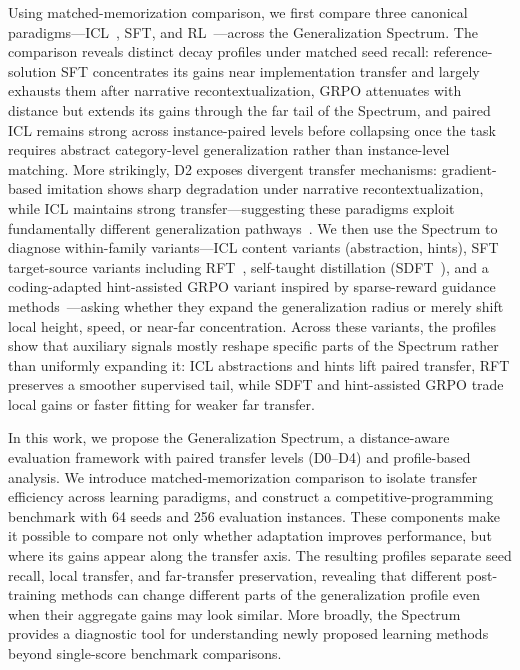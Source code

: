\documentclass[]{bytedance_seed}
\theoremstyle{plain}
\theoremstyle{definition}
\theoremstyle{remark}
\begin{document}
Using matched-memorization comparison, we first compare three canonical paradigms---ICL~\citep{brown2020language, dong2024survey}, SFT, and RL~\citep{ouyang2022training, shao2024grpo}---across the Generalization Spectrum. The comparison reveals distinct decay profiles under matched seed recall: reference-solution SFT concentrates its gains near implementation transfer and largely exhausts them after narrative recontextualization, GRPO attenuates with distance but extends its gains through the far tail of the Spectrum, and paired ICL remains strong across instance-paired levels before collapsing once the task requires abstract category-level generalization rather than instance-level matching. More strikingly, D2 exposes divergent transfer mechanisms: gradient-based imitation shows sharp degradation under narrative recontextualization, while ICL maintains strong transfer---suggesting these paradigms exploit fundamentally different generalization pathways~\citep{mosbach2023fewshot}. We then use the Spectrum to diagnose within-family variants---ICL content variants (abstraction, hints), SFT target-source variants including RFT~\citep{yuan2023rft}, self-taught distillation (SDFT~\citep{sdft2026,opsd2026,sdpo2026}), and a coding-adapted hint-assisted GRPO variant inspired by sparse-reward guidance methods~\citep{li2026questa,ghpo2025,zhang2026bread,zhang2025stephint,wang2026hint,huang2025hintgrpo,kang2025table}---asking whether they expand the generalization radius or merely shift local height, speed, or near-far concentration. Across these variants, the profiles show that auxiliary signals mostly reshape specific parts of the Spectrum rather than uniformly expanding it: ICL abstractions and hints lift paired transfer, RFT preserves a smoother supervised tail, while SDFT and hint-assisted GRPO trade local gains or faster fitting for weaker far transfer.

In this work, we propose the Generalization Spectrum, a distance-aware evaluation framework with paired transfer levels (D0--D4) and profile-based analysis. We introduce matched-memorization comparison to isolate transfer efficiency across learning paradigms, and construct a competitive-programming benchmark with 64 seeds and 256 evaluation instances. These components make it possible to compare not only whether adaptation improves performance, but where its gains appear along the transfer axis. The resulting profiles separate seed recall, local transfer, and far-transfer preservation, revealing that different post-training methods can change different parts of the generalization profile even when their aggregate gains may look similar. More broadly, the Spectrum provides a diagnostic tool for understanding newly proposed learning methods beyond single-score benchmark comparisons.
\end{document}

